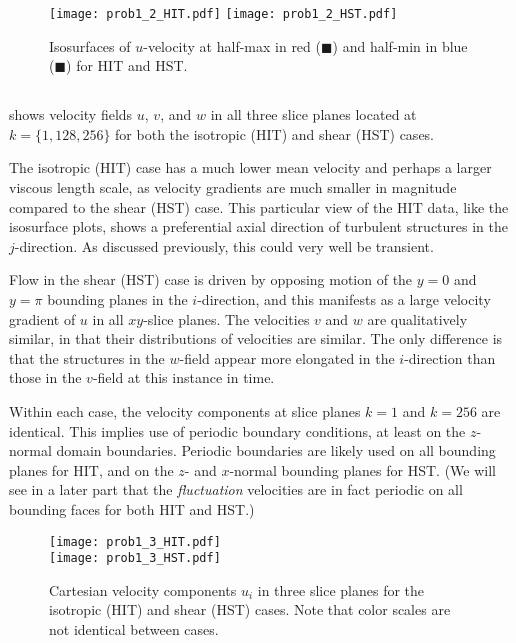 \documentclass[11pt]{article}
\begin{document}
\begin{figure}[t]
\centering
\texttt{[image: prob1\_2\_HIT.pdf]}
\texttt{[image: prob1\_2\_HST.pdf]}
\vspace{6pt}
\caption{Isosurfaces of $u$-velocity at half-max in red ({\color{red}$\blacksquare$}) and half-min in blue ({\color{blue}$\blacksquare$}) for HIT and HST.}
\label{fig:prob_1_2_isosurfaces}
\end{figure}

\subsection{}

 shows velocity fields $u$, $v$, and $w$ in all three slice planes located at $k = \{1, 128, 256\}$ for both the isotropic (HIT) and shear (HST) cases.

The isotropic (HIT) case has a much lower mean velocity and perhaps a larger viscous length scale, as velocity gradients are much smaller in magnitude compared to the shear (HST) case. This particular view of the HIT data, like the isosurface plots, shows a preferential axial direction of turbulent structures in the $j$-direction. As discussed previously, this could very well be transient.

Flow in the shear (HST) case is driven by opposing motion of the $y=0$ and $y=\pi$ bounding planes in the $i$-direction, and this manifests as a large velocity gradient of $u$ in all $xy$-slice planes. The velocities $v$ and $w$ are qualitatively similar, in that their distributions of velocities are similar. The only difference is that the structures in the $w$-field appear more elongated in the $i$-direction than those in the $v$-field at this instance in time.

Within each case, the velocity components at slice planes $k=1$ and $k=256$ are identical. This implies use of periodic boundary conditions, at least on the $z$-normal domain boundaries. Periodic boundaries are likely used on all bounding planes for HIT, and on the $z$- and $x$-normal bounding planes for HST. (We will see in a later part that the \emph{fluctuation} velocities are in fact periodic on all bounding faces for both HIT and HST.)

\begin{figure}[h!]
\centering
\texttt{[image: prob1\_3\_HIT.pdf]}
\\
\texttt{[image: prob1\_3\_HST.pdf]}
\\[6pt]
\caption{Cartesian velocity components $u_i$ in three slice planes for the isotropic (HIT) and shear (HST) cases. Note that color scales are not identical between cases.}
\label{fig:prob_1_3_slices}
\end{figure}
\end{document}
